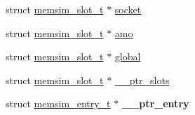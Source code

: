 \begin{DoxyCompactItemize}
\item 
struct \hyperlink{structmemsim__slot__t}{memsim\-\_\-slot\-\_\-t} $\ast$ \hyperlink{structmemsim__t_a42ae6dd8a64e2d04c30e35354ec25555}{socket}
\item 
struct \hyperlink{structmemsim__slot__t}{memsim\-\_\-slot\-\_\-t} $\ast$ \hyperlink{structmemsim__t_a9e7a2ce164d954f25105d93eaf040b3f}{amo}
\item 
struct \hyperlink{structmemsim__slot__t}{memsim\-\_\-slot\-\_\-t} $\ast$ \hyperlink{structmemsim__t_a3b005d5aa8e759a08281f59c9f05ed3b}{global}
\item 
struct \hyperlink{structmemsim__slot__t}{memsim\-\_\-slot\-\_\-t} $\ast$ \hyperlink{structmemsim__t_a13bfc8f8ea24eb83b5b3976aee534db3}{\-\_\-\-\_\-ptr\-\_\-slots}
\item 
\hypertarget{structmemsim__t_ac8e490728a0881577947adb893811324}{struct \hyperlink{structmemsim__entry__t}{memsim\-\_\-entry\-\_\-t} $\ast$ {\bfseries \-\_\-\-\_\-ptr\-\_\-entry}}\label{structmemsim__t_ac8e490728a0881577947adb893811324}

\end{DoxyCompactItemize}


